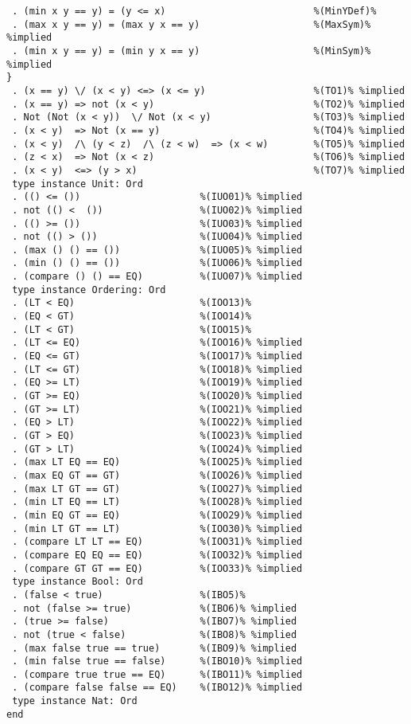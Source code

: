 \begin{Verbatim}
 . (min x y == y) = (y <= x)                          %(MinYDef)%
 . (max x y == y) = (max y x == y)                    %(MaxSym)% %implied
 . (min x y == y) = (min y x == y)                    %(MinSym)% %implied
}
 . (x == y) \/ (x < y) <=> (x <= y)                   %(TO1)% %implied
 . (x == y) => not (x < y)                            %(TO2)% %implied
 . Not (Not (x < y))  \/ Not (x < y)                  %(TO3)% %implied
 . (x < y)  => Not (x == y)                           %(TO4)% %implied
 . (x < y)  /\ (y < z)  /\ (z < w)  => (x < w)        %(TO5)% %implied
 . (z < x)  => Not (x < z)                            %(TO6)% %implied
 . (x < y)  <=> (y > x)                               %(TO7)% %implied
 type instance Unit: Ord
 . (() <= ())                     %(IUO01)% %implied
 . not (() <  ())                 %(IUO02)% %implied
 . (() >= ())                     %(IUO03)% %implied
 . not (() > ())                  %(IUO04)% %implied
 . (max () () == ())              %(IUO05)% %implied
 . (min () () == ())              %(IUO06)% %implied
 . (compare () () == EQ)          %(IUO07)% %implied
 type instance Ordering: Ord
 . (LT < EQ)                      %(IOO13)%
 . (EQ < GT)                      %(IOO14)%
 . (LT < GT)                      %(IOO15)%
 . (LT <= EQ)                     %(IOO16)% %implied
 . (EQ <= GT)                     %(IOO17)% %implied
 . (LT <= GT)                     %(IOO18)% %implied
 . (EQ >= LT)                     %(IOO19)% %implied
 . (GT >= EQ)                     %(IOO20)% %implied
 . (GT >= LT)                     %(IOO21)% %implied
 . (EQ > LT)                      %(IOO22)% %implied
 . (GT > EQ)                      %(IOO23)% %implied
 . (GT > LT)                      %(IOO24)% %implied
 . (max LT EQ == EQ)              %(IOO25)% %implied
 . (max EQ GT == GT)              %(IOO26)% %implied
 . (max LT GT == GT)              %(IOO27)% %implied
 . (min LT EQ == LT)              %(IOO28)% %implied
 . (min EQ GT == EQ)              %(IOO29)% %implied
 . (min LT GT == LT)              %(IOO30)% %implied
 . (compare LT LT == EQ)          %(IOO31)% %implied
 . (compare EQ EQ == EQ)          %(IOO32)% %implied
 . (compare GT GT == EQ)          %(IOO33)% %implied
 type instance Bool: Ord
 . (false < true)                 %(IBO5)%
 . not (false >= true)            %(IBO6)% %implied
 . (true >= false)                %(IBO7)% %implied
 . not (true < false)             %(IBO8)% %implied
 . (max false true == true)       %(IBO9)% %implied
 . (min false true == false)      %(IBO10)% %implied
 . (compare true true == EQ)      %(IBO11)% %implied
 . (compare false false == EQ)    %(IBO12)% %implied
 type instance Nat: Ord
end
\end{Verbatim}

